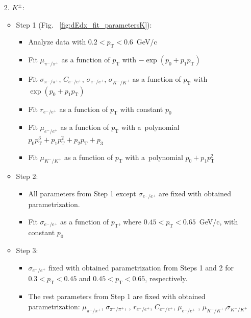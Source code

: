 \begin{enumerate}
	\item[2.] $K^\pm$:
	\begin{itemize}
		\item Step 1 (Fig. ~\ref{fig:dEdx_fit_parametersK}):
		\begin{itemize}
			\renewcommand\labelitemi{--}
			\item Analyze data with $0.2 < p_\textrm{T} < 0.6$~GeV/c
			\item Fit  $\mu_{\pi^-/\pi^+}$  as a function of $p_\textrm{T}$ with $-\exp\left(p_0+p_1p_\textrm{T}\right)$
			\item Fit $\sigma_{\pi^-/\pi^+}$, $C_{e^-/e^+}$, $\sigma_{e^-/e^+}$, $\sigma_{K^-/K^+}$ as a function of $p_\textrm{T}$ with $\exp\left(p_0+p_1p_\textrm{T}\right)$
			\item Fit $r_{e^-/e^+}$ as a function of $p_\textrm{T}$ with constant $p_0$ 
			\item Fit $\mu_{e^-/e^+}$ as a function of $p_\textrm{T}$ with a~polynomial  $p_0p_\textrm{T}^3+p_1p_\textrm{T}^2+p_2p_\textrm{T}+p_3$
			\item Fit $\mu_{K^-/K^+}$ as a function of $p_\textrm{T}$ with a~polynomial  $p_0+p_1p_\textrm{T}^2$
			
		\end{itemize}
		\item Step 2:
		\begin{itemize}
			\renewcommand\labelitemi{--}
			\item All parameters from Step 1 except $\sigma_{e^-/e^+}$ are fixed with obtained parametrization.
			\item  Fit $\sigma_{e^-/e^+}$ as a function of $p_\textrm{T}$, where $0.45<p_\textrm{T}<0.65$~GeV/c, with constant $p_0$ 
			
		\end{itemize}
		\item Step 3:
		\begin{itemize}
			\renewcommand\labelitemi{--}
			\item  $\sigma_{e^-/e^+}$ fixed with obtained parametrization from Steps 1 and 2 for $0.3<p_\textrm{T}<0.45$ and $0.45<p_\textrm{T}<0.65$, respectively.
			\item  The rest parameters from Step 1 are fixed with obtained parametrization: $\mu_{\pi^-/\pi^+}$, $\sigma_{\pi^-/\pi^+}$, , $r_{e^-/e^+}$, $C_{e^-/e^+}$, $\mu_{e^-/e^+}$ , $\mu_{K^-/K^+}$,$\sigma_{K^-/K^+}$
		\end{itemize}		
	\end{itemize}		
\end{enumerate} 

